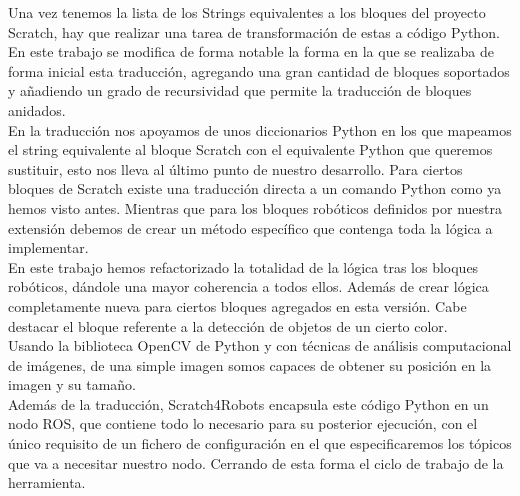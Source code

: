 Una vez tenemos la lista de los Strings equivalentes a los bloques del proyecto Scratch, hay que realizar una tarea de transformación de estas a código Python.\\

En este trabajo se modifica de forma notable la forma en la que se realizaba de forma inicial esta traducción, agregando una gran cantidad de bloques soportados y añadiendo un grado de recursividad que permite la traducción de bloques anidados.\\

En la traducción nos apoyamos de unos diccionarios Python en los que mapeamos el string equivalente al bloque Scratch con el equivalente Python que queremos sustituir, esto nos lleva al último punto de nuestro desarrollo. Para ciertos bloques de Scratch existe una traducción directa a un comando Python como ya hemos visto antes. Mientras que para los bloques robóticos definidos por nuestra extensión debemos de crear un método específico que contenga toda la lógica a implementar.\\

En este trabajo hemos refactorizado la totalidad de la lógica tras los bloques robóticos, dándole una mayor coherencia a todos ellos. Además de crear lógica completamente nueva para ciertos bloques agregados en esta versión. Cabe destacar el bloque referente a la detección de objetos de un cierto color.\\

Usando la biblioteca OpenCV de Python y con técnicas de análisis computacional de imágenes, de una simple imagen somos capaces de obtener su posición en la imagen y su tamaño.\\

Además de la traducción, Scratch4Robots encapsula este código Python en un nodo ROS, que contiene todo lo necesario para su posterior ejecución, con el único requisito de un fichero de configuración en el que especificaremos los tópicos que va a necesitar nuestro nodo. Cerrando de esta forma el ciclo de trabajo de la herramienta.\\